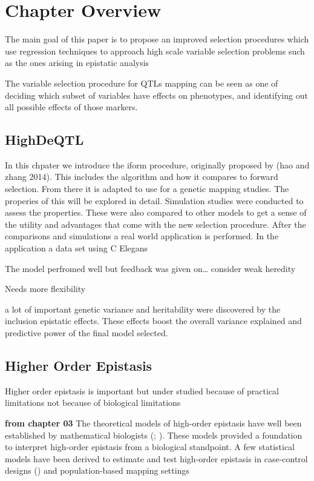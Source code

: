 \documentclass[11pt,]{book}
\theoremstyle{definition}
\theoremstyle{definition}
\theoremstyle{remark}
\begin{document}
\section{Chapter Overview}\label{chapter-overview}

The main goal of this paper is to propose an improved selection
procedures which use regression techniques to approach high scale
variable selection problems such as the ones arising in epistatic
analysis

The variable selection procedure for QTLs mapping can be seen as one of
deciding which subset of variables have effects on phenotypes, and
identifying out all possible effects of those markers.

\subsection{HighDeQTL}\label{highdeqtl}

In this chpater we introduce the iform procedure, originally proposed by
(hao and zhang 2014). This includes the algorithm and how it compares to
forward selection. From there it is adapted to use for a genetic mapping
studies. The properies of this will be explored in detail. Simulation
studies were conducted to assess the properties. These were also
compared to other models to get a sense of the utility and advantages
that come with the new selection procedure. After the comparisons and
simulations a real world application is performed. In the application a
data set using C Elegans

The model perfromed well but feedback was given on\ldots{} consider weak
heredity

Needs more flexibility

a lot of important genetic variance and heritability were discovered by
the inclusion epistatic effects. These effects boost the overall
variance explained and predictive power of the final model selected.

\subsection{Higher Order Epistasis}\label{higher-order-epistasis}

Higher order epistasis is important but under studied because of
practical limitations not because of biological limitations

\textbf{from chapter 03} The theoretical models of high-order epistasis
have well been established by mathematical biologists
(\cite{hansen2001epistasis}; \cite{beerenwinkel2007analysis}). These
models provided a foundation to interpret high-order epistasis from a
biological standpoint. A few statistical models have been derived to
estimate and test high-order epistasis in case-control designs
(\cite{wang2015bayesian}) and population-based mapping settings
\end{document}
